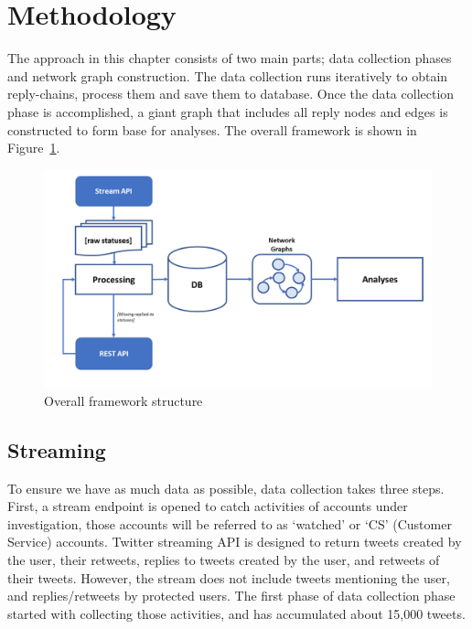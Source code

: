 \documentclass[sigconf]{acmart}
\begin{document}
\section{Methodology}\label{method}

The approach in this chapter consists of two main parts; data
collection phases and network graph construction. The data collection
runs iteratively to obtain reply-chains, process them and save them to
database. Once the data collection phase is accomplished, a giant
graph that includes all reply nodes and edges is constructed to form
base for analyses. The overall framework is shown in
Figure~\ref{fig:frameworkstructure}.

\begin{figure}[htb]
\centering
\includegraphics[width=\columnwidth]{images/frameworkstructure.png}
\caption{Overall framework structure}
\label{fig:frameworkstructure}
\end{figure}

\subsection{Streaming}

To ensure we have as much data as possible, data collection takes
three steps. First, a stream endpoint is opened to catch activities of
accounts under investigation, those accounts will be referred to as
`watched' or `CS' (Customer Service) accounts. Twitter streaming API
is designed to return tweets created by the user, their retweets,
replies to tweets created by the user, and retweets of their
tweets. However, the stream does not include tweets mentioning the
user, and replies/retweets by protected users. The first phase of data
collection phase started with collecting those activities, and has
accumulated about 15,000 tweets.
\end{document}
